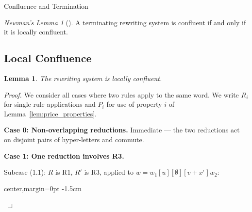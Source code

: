 \documentclass{article}
\newtheorem{lemma}[theorem]{Lemma}
\theoremstyle{definition}
\theoremstyle{remark}
\theoremstyle{theorem}
\newtheorem*{newmanslemma}{Newman's Lemma}
\theoremstyle{definition}
\begin{document}
\begin{section}{Confluence and Termination}

\begin{newmanslemma}[\cite{Newman42}]
    A terminating rewriting system is confluent if and only if it is locally confluent.
\end{newmanslemma}

\subsection{Local Confluence}

\begin{lemma}\label{lem:local_confluence}
    The rewriting system is locally confluent.
\end{lemma}

\begin{proof}
We consider all cases where two rules apply to the same word. We write $R_i$ for single rule applications and $P_i$ for use of property $i$ of Lemma~\ref{lem:price_properties}.

\textbf{Case 0: Non-overlapping reductions.} Immediate --- the two reductions act on disjoint pairs of hyper-letters and commute.

\textbf{Case 1: One reduction involves R3.}

Subcase (1.1): $R$ is R1, $R'$ is R3, applied to $w = w_1[u][\emptyset][v+x^\epsilon]w_2$:

\vspace{20pt}
\begin{center}
\begin{adjustbox}{center,margin=0pt -1.5cm}
\end{adjustbox}
\end{center}
\vspace{30pt}


\end{proof}
\end{section}
\end{document}
